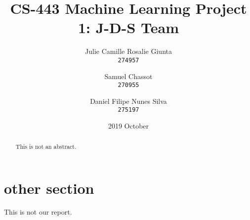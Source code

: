 \documentclass[11pt, a4paper, twoside]{article}
\begin{document}
\date{2019 October}
\title{CS-443 Machine Learning Project 1: J-D-S Team}
\author{
  Julie Camille Rosalie Giunta\\
  \texttt{274957}
  \and
  Samuel Chassot\\
  \texttt{270955}
  \and
  Daniel Filipe Nunes Silva\\
  \texttt{275197}
}

\maketitle
\clearpage

\begin{abstract}
This is not an abstract.
\end{abstract}


 
\section{other section}
This is not our report.
\end{document}
